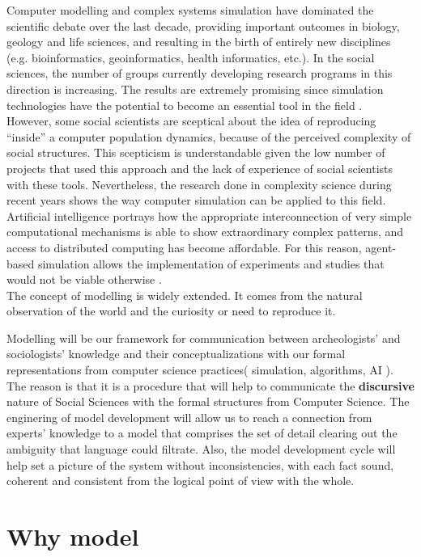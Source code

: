 \documentclass{report}
\begin{document}
Computer modelling and complex systems simulation have dominated the scientific debate over the last decade, providing important outcomes in biology, geology and life sciences, and resulting in the birth of entirely new disciplines (e.g. bioinformatics, geoinformatics, health informatics, etc.). In the social sciences, the number of groups currently developing research programs in this direction is increasing. The results are extremely promising since simulation technologies have the potential to become an essential tool in the field \cite{Gilbert2008}.\\
However, some social scientists are sceptical about the idea of reproducing “inside” a computer population dynamics, because of the perceived complexity of social structures. This scepticism is understandable given the low number of projects that used this approach and the lack of experience of social scientists with these tools. Nevertheless, the research done in complexity science during recent years shows the way computer simulation can be applied to this field. Artificial intelligence portrays how the appropriate interconnection of very simple computational mechanisms is able to show extraordinary complex patterns, and access to distributed computing has become affordable. For this reason, agent-based simulation allows the implementation of experiments and studies that would not be viable otherwise \cite{Pavon2008}. \\

The concept of modelling is widely extended. It comes from the natural observation of the world and the curiosity or need to reproduce it.

Modelling will be our framework for communication between archeologists' and sociologists' knowledge and their conceptualizations with our formal representations from computer science practices( simulation, algorithms, AI ).
The reason is that it is a procedure that will help to communicate the \textbf{discursive} nature of Social Sciences with the formal structures from Computer Science. The enginering of model development will allow us to reach a connection from experts' knowledge to a model that comprises the set of detail clearing out the ambiguity that language could filtrate. Also, the model development cycle will help set a picture of the system without inconsistencies, with each fact sound,  coherent and consistent from the logical point of view with the whole. 


\section{Why model}
\end{document}
